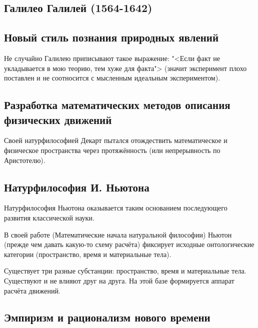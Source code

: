 \documentclass[main.tex]{subfiles}
\begin{document}
\subsection{Галилео Галилей (1564-1642)}


\subsection{Новый стиль познания природных явлений}


Не случайно Галилею приписывают такое выражение: "<Если факт не укладывается в мою теорию, тем хуже для факта"> (значит эксперимент плохо поставлен и не соотносится с мысленным идеальным экспериментом).

\subsection{Разработка математических методов описания физических движений}


Своей натурфилософией Декарт пытался отождествить математическое и физическое пространства через протяжённость (или непрерывность по Аристотелю).

\subsection{Натурфилософия И. Ньютона}


Натурфилософия Ньютона оказывается таким основанием последующего развития классической науки.

В своей работе (Математические начала натуральной философии) Ньютон (прежде чем давать какую-то схему расчёта) фиксирует исходные онтологические категории (пространство, время и материальные тела).

Существует три разные субстанции: пространство, время и материальные тела.
Существуют и не влияют друг на друга.
На этой базе формируется аппарат расчёта движений.

\subsection{Эмпиризм и рационализм нового времени}

\end{document}
